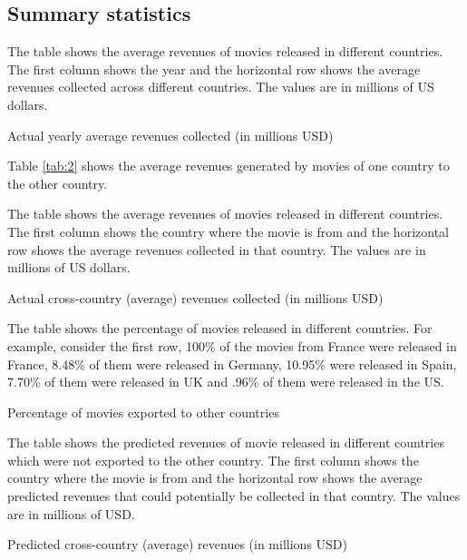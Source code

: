 \documentclass[11pt, letterpaper]{article} \usepackage{amsmath}
\newcommand{\floatintro}[1]{
  
  \vspace*{0.1in}
  
  {\footnotesize

    #1
    
  }
  
  \vspace*{0.1in} } \newcommand{\Hline}{\noindent\rule{18cm}{0.5pt}}
\begin{document}
\subsection{Summary statistics}

\begin{table}[htbp!]
  \floatintro{The table shows the average revenues of movies released
    in different countries. The first column shows the year and the
    horizontal row shows the average revenues collected across
    different countries. The values are in millions of US dollars.}
  \centering
  
  \caption{Actual yearly average revenues collected (in millions USD)}
  \label{tab:1}
\end{table}

Table \ref{tab:2} shows the average revenues generated by movies of
one country to the other country.
\begin{table}[htbp!]
  \floatintro{The table shows the average revenues of movies released
    in different countries. The first column shows the country where
    the movie is from and the horizontal row shows the average
    revenues collected in that country. The values are in millions of
    US dollars.}
  \centering
  
  \caption{Actual cross-country (average) revenues collected (in millions USD)}
  \label{tab:2}
\end{table}

\begin{table}[htbp!]
  \floatintro{The table shows the percentage of movies released in
    different countries. For example, consider the first row, 100\% of
    the movies from France were released in France, 8.48\% of them
    were released in Germany, 10.95\% were released in Spain, 7.70\%
    of them were released in UK and .96\% of them were released in the
    US.}
  \centering
  
  \caption{Percentage of movies exported to other countries}
  \label{tab:tab3}
\end{table}

\begin{table}[htbp!]
  \floatintro{The table shows the predicted revenues of movie released
    in different countries which were not exported to the other
    country. The first column shows the country where the movie is from
    and the horizontal row shows the average predicted revenues that
    could potentially be collected in that country. The values are in
    millions of USD.}
  \centering
  
  \caption{Predicted cross-country (average) revenues (in millions USD)}
  \label{tab:tab4}
\end{table}
\end{document}
